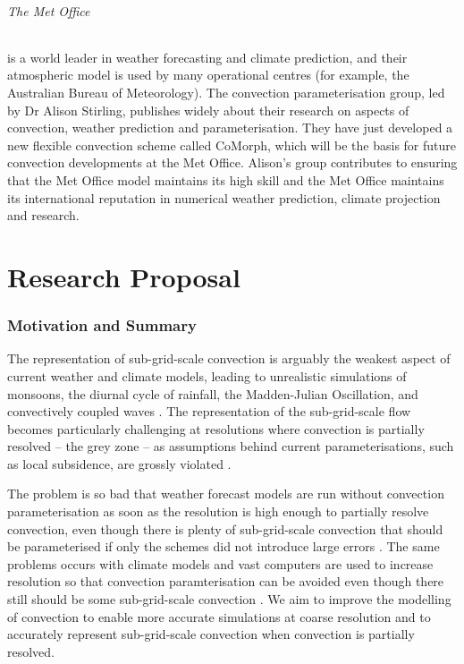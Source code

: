 \documentclass[11pt,a4paper]{article}
\begin{document}
\paragraph*{The Met Office} is a world leader in weather forecasting and climate prediction, and their atmospheric model is used by many operational centres (for example, the Australian Bureau of Meteorology). The convection parameterisation group, led by Dr Alison Stirling, publishes widely about their research on aspects of convection, weather prediction and parameterisation. They have just developed a new flexible convection scheme called CoMorph, which will be the basis for future convection developments at the Met Office. Alison's group contributes to ensuring that the Met Office model maintains its high skill and the Met Office maintains its international reputation in numerical weather prediction, climate projection and research. 



\newpage

\part{Research Proposal}

\section{Motivation and Summary}

The representation of sub-grid-scale convection is arguably the weakest aspect of current weather and climate models, leading to unrealistic simulations of monsoons, the diurnal cycle of rainfall, the Madden-Julian Oscillation, and convectively coupled waves  \cite[]{SAB+13,HPB+14}. The representation of the sub-grid-scale flow becomes particularly challenging at resolutions where convection is partially resolved -- the grey zone -- as assumptions behind current parameterisations, such as local subsidence, are grossly violated \cite[e.g.][]{GG05}.

The problem is so bad that weather forecast models are run without convection parameterisation as soon as the resolution is high enough to partially resolve convection, even though there is plenty of sub-grid-scale convection that should be parameterised if only the schemes did not introduce large errors \cite[]{LCD+08}. The same problems occurs with climate models and vast computers are used to increase resolution so that convection paramterisation can be avoided even though there still should be some sub-grid-scale convection \cite[]{SSJ+19}. We aim to improve the modelling of convection to enable more accurate simulations at coarse resolution and to accurately represent sub-grid-scale convection when convection is partially resolved. 
\end{document}
